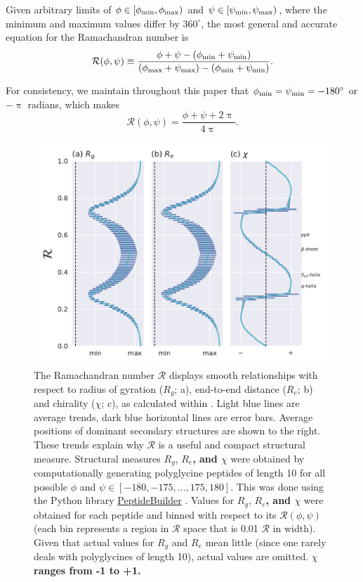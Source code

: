 \documentclass[fleqn,10pt,lineno]{wlpeerj} %
\newcommand{\n}[1]{{\textbf{\color{red}#1}}}
\newcommand{\rr}{$\mathcal{R}$\xspace}
\begin{document}

Given arbitrary limits of $\phi \in [\phi_{\rm min},\phi_{\rm max})$ and $\psi \in [\psi_{\rm min},\psi_{\rm max})$, where the minimum and maximum values differ by $360^\circ$, the most general and accurate equation for the Ramachandran number is
\begin{equation}
{\mathcal{R}}(\phi,\psi) \equiv  \frac{\phi+\psi-(\phi_{\rm min}+\psi_{\rm min})}{(\phi_{\rm max}+\psi_{\rm max})-(\phi_{\rm min}+\psi_{\rm min})}.
\label{ramaGeneral}
\end{equation}

For consistency, we maintain throughout this paper that $\phi_{\rm min} = \psi_{\rm min} = -180^\circ$ or $-\uppi$ radians, which makes 
\begin{equation}
\mathcal{R}(\phi,\psi) = \frac{\phi+\psi+2\uppi}{4\uppi}.\label{eqn:rama}
\end{equation}

\begin{figure}[t!]
\begin{adjustwidth}{-1in}{0in} %
\centering
\includegraphics[width=0.6\linewidth]{automated_figures/fig_r_intro.pdf}
\caption{The Ramachandran number \rr displays smooth relationships with respect to radius of gyration ($R_g$; a), end-to-end distance ($R_e$; b) and chirality ($\chi$; c), as calculated within \cite{Mannige2017}. Light blue lines are average trends, dark blue horizontal lines are error bars. Average positions of dominant secondary structures are shown to the right. These trends explain why \rr is a useful and compact structural measure. Structural measures $R_g$, $R_e$\n{, and $\chi$} were obtained by computationally generating polyglycine peptides of length 10 for all possible $\phi$ and $\psi \in [-180,-175,\ldots,175,180]$. This was done using the Python library \href{https://github.com/mtien/PeptideBuilder}{PeptideBuilder} \citep{Tien2013}. Values for $R_g$, $R_e$\n{, and $\chi$} were obtained for each peptide and binned with respect to its {$\mathcal{R}(\phi,\psi)$} (each bin represents a region in \rr space that is 0.01 \rr in width). Given that actual values for $R_g$ and $R_e$ mean little (since one rarely deals with polyglycines of length 10), actual values are omitted. \n{$\chi$ ranges from -1 to +1.} \label{fig:r_smooth}} 
\end{adjustwidth}
\end{figure}
\end{document}
